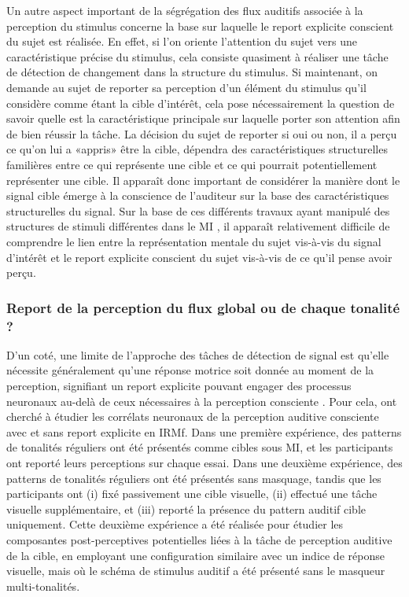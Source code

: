 Un autre aspect important de la ségrégation des flux auditifs associée à la perception du stimulus concerne la base sur laquelle le report explicite conscient du sujet est réalisée. 
En effet, si l'on oriente l'attention du sujet vers une caractéristique précise du stimulus, cela consiste quasiment à réaliser une tâche de détection de changement dans la structure du stimulus. 
Si maintenant, on demande au sujet de reporter sa perception d'un élément du stimulus qu'il considère comme étant la cible d'intérêt, cela pose nécessairement la question de savoir quelle est la caractéristique principale sur laquelle porter son attention afin de bien réussir la tâche. 
La décision du sujet de reporter si oui ou non, il a perçu ce qu'on lui a «appris» être la cible, dépendra des caractéristiques structurelles familières entre ce qui représente une cible et ce qui pourrait potentiellement représenter une cible. 
Il apparaît donc important de considérer la manière dont le signal cible émerge à la conscience de l'auditeur sur la base des caractéristiques structurelles du signal. 
Sur la base de ces différents travaux ayant manipulé des structures de stimuli différentes dans le MI \citep{akram2014investigating, elhilali2009interaction, eriksson2017activity, giani2015detecting, gutschalk2008neural, wiegand2012correlates}, il apparaît relativement difficile de comprendre le lien entre la représentation mentale du sujet vis-à-vis du signal d'intérêt et le report explicite conscient du sujet vis-à-vis de ce qu'il pense avoir perçu. 

\subsubsection{Report de la perception du flux global ou de chaque tonalité ?}

D'un coté, une limite de l'approche des tâches de détection de signal est qu'elle nécessite généralement qu'une réponse motrice soit donnée au moment de la perception, signifiant un report explicite pouvant engager des processus neuronaux au-delà de ceux nécessaires à la perception consciente \citep{aru2012distilling, wiegand2018cortical}. 
Pour cela, \cite{wiegand2018cortical} ont cherché à étudier les corrélats neuronaux de la perception auditive consciente avec et sans report explicite en IRMf. 
Dans une première expérience, des patterns de tonalités réguliers ont été présentés comme cibles sous MI, et les participants ont reporté leurs perceptions sur chaque essai. 
Dans une deuxième expérience, des patterns de tonalités réguliers ont été présentés sans masquage, tandis que les participants ont (i) fixé passivement une cible visuelle, (ii) effectué une tâche visuelle supplémentaire, et (iii) reporté la présence du pattern auditif cible uniquement. 
Cette deuxième expérience a été réalisée pour étudier les composantes post-perceptives potentielles liées à la tâche de perception auditive de la cible, en employant une configuration similaire avec un indice de réponse visuelle, mais où le schéma de stimulus auditif a été présenté sans le masqueur multi-tonalités. 


